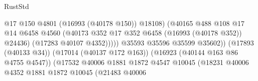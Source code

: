\begin{lexlean}{RustStd}
\begin{coremodule}
                                                            @17
                                                            @150
                                                            @4801
                                                            (@16993 (@40178 @150))
                                                            @18108)
                                                          (@40165
                                                            @488
                                                            @108
                                                            @17
                                                            @14
                                                            @6458
                                                            @4560
                                                            (@40173
                                                              @352
                                                              @17
                                                              @352
                                                              @6458
                                                              (@16993 (@40178 @352))
                                                              @24436)
                                                            (@17283 @40107 @4352)))))
                                                    @35593
                                                    @35596
                                                    @35599
                                                    @35602))
                                                (@17893 (@40133 @34))
                                                (@17014 (@40137 @172 @163))
                                                (@16923 (@40144 @163 @86 @4755 @4547))
                                                (@17532
                                                  @40006
                                                  @1881
                                                  @1872
                                                  @4547
                                                  @10045
                                                  (@18231
                                                    @40006
                                                    @4352
                                                    @1881
                                                    @1872
                                                    @10045
                                                    (@21483
                                                      @40006

\end{coremodule}
\end{lexlean}
